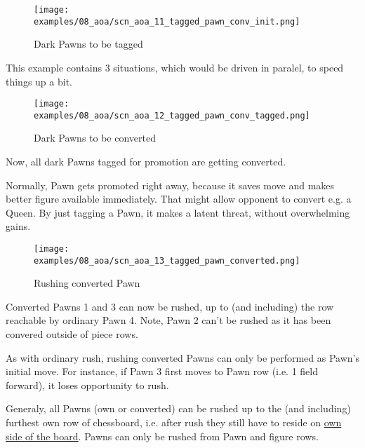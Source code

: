 \noindent
\begin{figure}[h]
\texttt{[image: examples/08\_aoa/scn\_aoa\_11\_tagged\_pawn\_conv\_init.png]}
\caption{Dark Pawns to be tagged}
\label{fig:scn_aoa_11_tagged_pawn_conv_init}
\end{figure}

This example contains 3 situations, which would be driven in paralel, to speed
things up a bit.

\clearpage %

\noindent
\begin{figure}[h]
\texttt{[image: examples/08\_aoa/scn\_aoa\_12\_tagged\_pawn\_conv\_tagged.png]}
\caption{Dark Pawns to be converted}
\label{fig:scn_aoa_12_tagged_pawn_conv_tagged}
\end{figure}

Now, all dark Pawns tagged for promotion are getting converted.

Normally, Pawn gets promoted right away, because it saves move and makes better
figure available immediately. That might allow opponent to convert e.g. a Queen.
By just tagging a Pawn, it makes a latent threat, without overwhelming gains.

\clearpage %

\noindent
\begin{figure}[h]
\texttt{[image: examples/08\_aoa/scn\_aoa\_13\_tagged\_pawn\_converted.png]}
\caption{Rushing converted Pawn}
\label{fig:scn_aoa_13_tagged_pawn_converted}
\end{figure}

Converted Pawns 1 and 3 can now be rushed, up to (and including) the row
reachable by ordinary Pawn 4. Note, Pawn 2 can't be rushed as it has been
convered outside of piece rows.

As with ordinary rush, rushing converted Pawns can only be performed as Pawn's
initial move. For instance, if Pawn 3 first moves to Pawn row (i.e. 1 field
forward), it loses opportunity to rush.

Generaly, all Pawns (own or converted) can be rushed up to the (and including)
furthest own row of chessboard, i.e. after rush they still have to reside on
\hyperref[sec:Definitions/Sides of chessboard]{own side of the board}.
Pawns can only be rushed from Pawn and figure rows.

